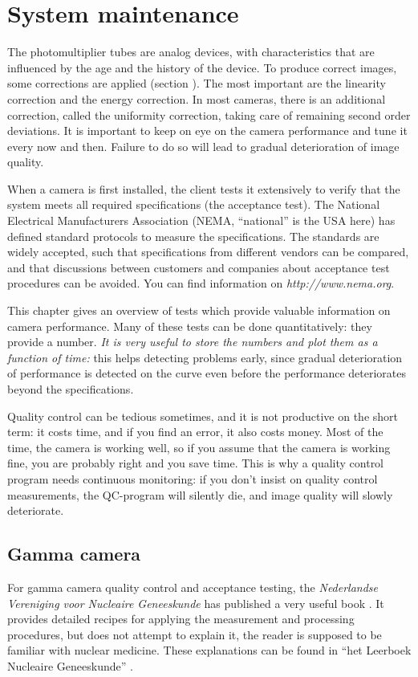 \chapter{System maintenance}

The photomultiplier tubes are analog devices, with characteristics
that are influenced by the age and the history of the device. To
produce correct images, some corrections are applied (section
). The most important are the linearity
correction and the energy correction. In most cameras, there is an
additional correction, called the uniformity correction, taking care
of remaining second order deviations. It is important to keep on eye
on the camera performance and tune it every now and then. Failure to
do so will lead to gradual deterioration of image quality.

When a camera is first installed, the client tests it extensively to
verify that the system meets all required specifications (the
acceptance test). The National Electrical Manufacturers Association
(NEMA, ``national'' is the USA here) has defined standard protocols to
measure the specifications. The standards are widely accepted, such
that specifications from different vendors can be compared, and that
discussions between customers and companies about acceptance test
procedures can be avoided. You can find information on {\em
http://www.nema.org}.

This chapter gives an overview of tests which provide valuable information on
camera performance. Many of these tests can be done quantitatively: they
provide a number. {\em It is very useful to store the numbers and plot them as
a function of time:} this helps detecting problems early, since gradual
deterioration of performance is detected on the curve even before the
performance deteriorates beyond the specifications.

Quality control can be tedious sometimes, and it is not productive on
the short term: it costs time, and if you find an error, it also costs
money. Most of the time, the camera is working well, so if you assume
that the camera is working fine, you are probably right and you save
time. This is why a quality control program needs continuous
monitoring: if you don't insist on quality control measurements, the
QC-program will silently die, and image quality will slowly
deteriorate.

\section{Gamma camera}
For gamma camera quality control and acceptance testing, the {\em Nederlandse
Vereniging voor Nucleaire Geneeskunde} has published a very useful book
\cite{Aanbevelingen}. It provides detailed recipes for applying the
measurement and processing procedures, but does not attempt to explain it, the
reader is supposed to be familiar with nuclear medicine. These explanations
can be found in ``het Leerboek Nucleaire Geneeskunde'' \cite{Leerboek}.


